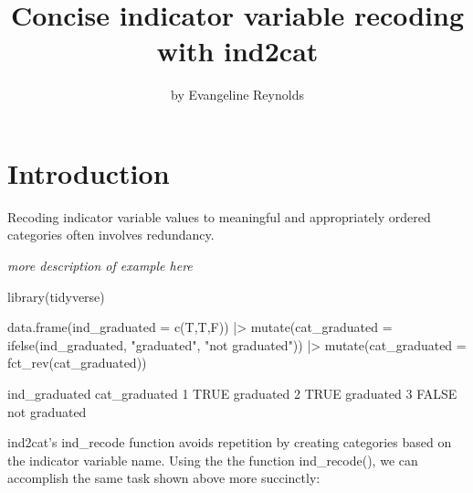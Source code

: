 \title{Concise indicator variable recoding with ind2cat}
\author{by Evangeline Reynolds}

\maketitle


\hypertarget{introduction}{%
\section{Introduction}\label{introduction}}

Recoding indicator variable values to meaningful and appropriately
ordered categories often involves redundancy.

\emph{more description of example here}

\begin{Schunk}
\begin{Sinput}
library(tidyverse)

data.frame(ind_graduated = c(T,T,F)) |>
  mutate(cat_graduated  = ifelse(ind_graduated, 
                                 "graduated", 
                                 "not graduated")) |>
  mutate(cat_graduated = fct_rev(cat_graduated))  
\end{Sinput}
\begin{Soutput}
       ind_graduated cat_graduated
     1          TRUE     graduated
     2          TRUE     graduated
     3         FALSE not graduated
\end{Soutput}
\end{Schunk}

ind2cat's ind\_recode function avoids repetition by creating categories
based on the indicator variable name. Using the the function
ind\_recode(), we can accomplish the same task shown above more
succinctly:

